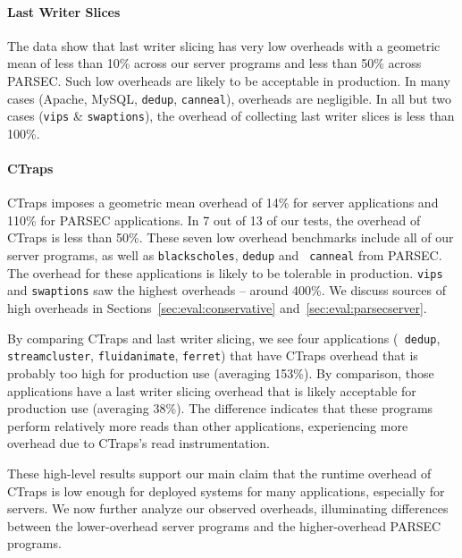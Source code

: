 \documentclass[preprint,9pt]{sigplanconf}
\newcommand{\ctraps}{CTraps\xspace}
\begin{document}
\paragraph{Last Writer Slices}
The data show that last writer slicing has very low overheads with a geometric
mean of less than 10\% across our server programs and less than 50\% across
PARSEC.  Such low overheads are likely to be acceptable in production.  In many
cases (Apache, MySQL, {\tt dedup}, {\tt canneal}), overheads are negligible.
In all but two cases ({\tt vips} \& {\tt swaptions}), the overhead of
collecting last writer slices is less than 100\%.    

\paragraph{\ctraps}
\ctraps imposes a geometric mean overhead of 14\% for server applications and
110\% for PARSEC applications.  In 7 out of 13 of our tests, the overhead of
\ctraps is less than 50\%.  These seven low overhead benchmarks include all of
our server programs, as well as {\tt blackscholes}, {\tt dedup} and {\tt
canneal} from PARSEC.  The overhead for these applications is likely to be
tolerable in production.  {\tt vips} and {\tt swaptions} saw the highest
overheads -- around 400\%.  We discuss sources of high overheads in
Sections~\ref{sec:eval:conservative} and~\ref{sec:eval:parsecserver}.

By comparing \ctraps and last writer slicing, we see four applications ({\tt
dedup}, {\tt streamcluster}, {\tt fluidanimate}, {\tt ferret}) that have
\ctraps overhead that is probably too high for production use (averaging
153\%).  By comparison, those applications have a last writer slicing overhead
that is likely acceptable for production use (averaging 38\%).  The difference
indicates that these programs perform relatively more reads than other
applications, experiencing more overhead due to \ctraps's read instrumentation.

These high-level results support our main claim that the runtime overhead of
\ctraps is low enough for deployed systems for many applications, especially
for servers.  We now further analyze our observed overheads, illuminating
differences between the lower-overhead server programs and the higher-overhead
PARSEC programs.
\end{document}
